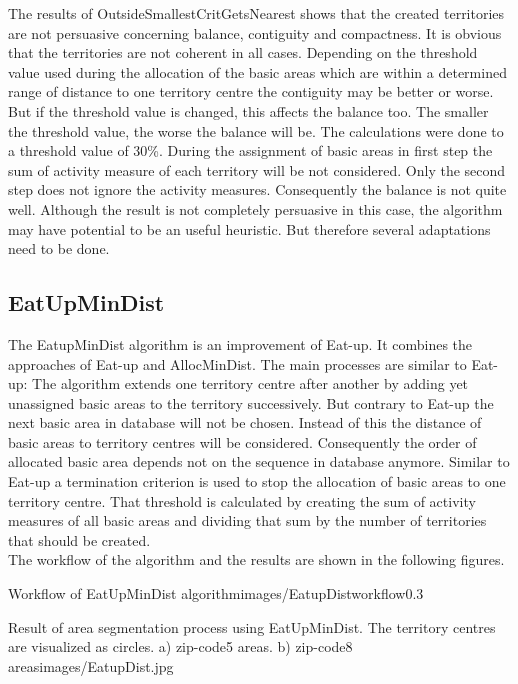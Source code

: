 The results of OutsideSmallestCritGetsNearest shows that the created territories are not persuasive concerning balance, contiguity and compactness. It is obvious that the territories are not coherent in all cases. Depending on the threshold value used during the allocation of the basic areas which are within a determined range of distance to one territory centre the contiguity may be better or worse. But if the threshold value is changed, this affects the balance too. The smaller the threshold value, the worse the balance will be. The calculations were done to a threshold value of 30\%. During the assignment of basic areas in first step the sum of activity measure of each territory will be not considered. Only the second step does not ignore the activity measures. Consequently the balance is not quite well. Although the result is not completely persuasive in this case, the algorithm may have potential to be an useful heuristic. But therefore several adaptations need to be done.

\subsection{EatUpMinDist}
The EatupMinDist algorithm is an improvement of Eat-up. It combines the approaches of Eat-up and AllocMinDist. The main processes are similar to Eat-up: The algorithm extends one territory centre after another by adding yet unassigned basic areas to the territory successively. But contrary to Eat-up the next basic area in database will not be chosen. Instead of this the distance of basic areas to territory centres will be considered. Consequently the order of allocated basic area depends not on the sequence in database anymore. Similar to Eat-up a termination criterion is used to stop the allocation of basic areas to one territory centre. That threshold is calculated by creating the sum of activity measures of all basic areas and dividing that sum by the number of territories that should be created.\\
The workflow of the algorithm and the results are shown in the following figures.


\begin{figurevarSize}{Workflow of EatUpMinDist algorithm}{images/EatupDistworkflow}{0.3}\end{figurevarSize}


\begin{figureOwn}{Result of area segmentation process using EatUpMinDist. The territory centres are visualized as circles. a) zip-code5 areas. b) zip-code8 areas}{images/EatupDist.jpg}\end{figureOwn}

